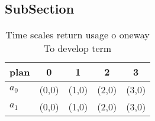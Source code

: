 \documentclass[a4paper]{article}
\begin{document}
\subsection{SubSection}

\begin{table}
\begin{adjustbox}{width=0.7\columnwidth}
\begin{tabular}{|l|l|l|l|l|}
\hline
\textbf{plan} & \multicolumn{1}{c|}{\textbf{0}} & \multicolumn{1}{c|}{\textbf{1}} & \multicolumn{1}{c|}{\textbf{2}} & \multicolumn{1}{c|}{\textbf{3}} \\ \hline
\textbf{$a_0$}  & (0,0) & (1,0) & (2,0) & (3,0) \\ \hline
\textbf{$a_1$}  & (0,0) & (1,0) & (2,0) & (3,0) \\ \hline
\end{tabular}
\end{adjustbox}
\caption{Time scales return usage o oneway To develop term
}
\end{table}
\end{document}

